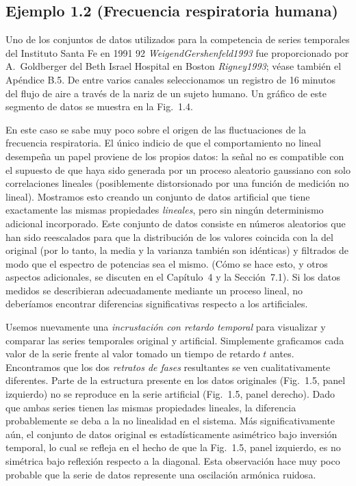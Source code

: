 \documentclass[10pt,a4paper]{book}
\begin{document}
\subsection*{Ejemplo 1.2 (Frecuencia respiratoria humana)}

Uno de los conjuntos de datos utilizados para la competencia de series temporales del Instituto Santa Fe en 1991 92 \textit{WeigendGershenfeld1993} fue proporcionado por A.~Goldberger del Beth Israel Hospital en Boston \textit{Rigney1993}; véase también el Apéndice B.5. De entre varios canales seleccionamos un registro de 16 minutos del flujo de aire a través de la nariz de un sujeto humano. Un gráfico de este segmento de datos se muestra en la Fig.~1.4.

En este caso se sabe muy poco sobre el origen de las fluctuaciones de la frecuencia respiratoria. El único indicio de que el comportamiento no lineal desempeña un papel proviene de los propios datos: la señal no es compatible con el supuesto de que haya sido generada por un proceso aleatorio gaussiano con solo correlaciones lineales (posiblemente distorsionado por una función de medición no lineal). Mostramos esto creando un conjunto de datos artificial que tiene exactamente las mismas propiedades \emph{lineales}, pero sin ningún determinismo adicional incorporado. Este conjunto de datos consiste en números aleatorios que han sido reescalados para que la distribución de los valores coincida con la del original (por lo tanto, la media y la varianza también son idénticas) y filtrados de modo que el espectro de potencias sea el mismo. (Cómo se hace esto, y otros aspectos adicionales, se discuten en el Capítulo~4 y la Sección~7.1). Si los datos medidos se describieran adecuadamente mediante un proceso lineal, no deberíamos encontrar diferencias significativas respecto a los artificiales.

Usemos nuevamente una \emph{incrustación con retardo temporal} para visualizar y comparar las series temporales original y artificial. Simplemente graficamos cada valor de la serie frente al valor tomado un tiempo de retardo $t$ antes. Encontramos que los dos \emph{retratos de fases} resultantes se ven cualitativamente diferentes. Parte de la estructura presente en los datos originales (Fig.~1.5, panel izquierdo) no se reproduce en la serie artificial (Fig.~1.5, panel derecho). Dado que ambas series tienen las mismas propiedades lineales, la diferencia probablemente se deba a la no linealidad en el sistema. Más significativamente aún, el conjunto de datos original es estadísticamente asimétrico bajo inversión temporal, lo cual se refleja en el hecho de que la Fig.~1.5, panel izquierdo, es no simétrica bajo reflexión respecto a la diagonal. Esta observación hace muy poco probable que la serie de datos represente una oscilación armónica ruidosa.
\end{document}

